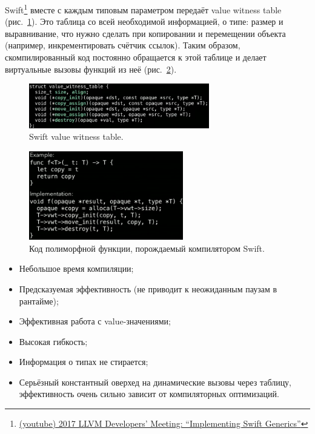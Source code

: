 Swift\footnote{\href{https://youtu.be/ctS8FzqcRug?si=y_ZYnuUOulA33d_X}{(youtube) 2017 LLVM Developers’ Meeting: ``Implementing Swift Generics''}} вместе с каждым типовым параметром передаёт value witness table (рис.~\ref{fig:swift-witness-table}).
Это таблица со всей необходимой информацией, о типе: размер и выравнивание, что нужно сделать при копировании и перемещении объекта (например, инкрементировать счётчик ссылок).
Таким образом, скомпилированный код постоянно обращается к этой таблице и делает виртуальные вызовы функций из неё (рис.~\ref{fig:swift-generated-code}).
\begin{figure}
    \centering
    \includegraphics[width=0.7\textwidth]{figs/swift-witness-table}
    \caption{Swift value witness table.}
    \label{fig:swift-witness-table}
\end{figure}
\begin{figure}
    \centering
    \includegraphics[width=0.6\textwidth]{figs/swift-generated-code}
    \caption{Код полиморфной функции, порождаемый компилятором Swift.}
    \label{fig:swift-generated-code}
\end{figure}

\begin{itemize}
    \item[\positive] Небольшое время компиляции;
    \item[\positive] Предсказуемая эффективность (не приводит к неожиданным паузам в рантайме);
    \item[\positive] Эффективная работа с value-значениями;
    \item[\positive] Высокая гибкость;
    \item[\positive] Информация о типах не стирается;
    \item[\negative] Серьёзный константный оверхед на динамические вызовы через таблицу, эффективность очень сильно зависит от компиляторных оптимизаций.
\end{itemize}

